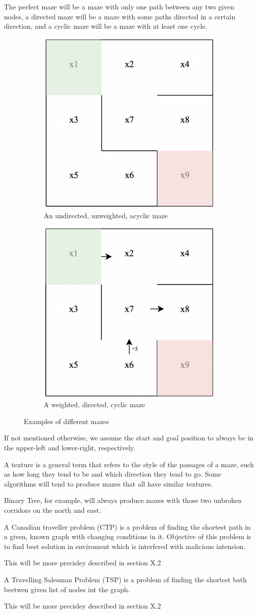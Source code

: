  The perfect maze will be a maze with only one path between any two given nodes, a directed maze will be a maze with some paths directed in a certain direction, and a cyclic maze will be a maze with at least one cycle. 
 \begin{figure}
	\centering
	\begin{subfigure}{.5\textwidth}
	  \centering
	  \includegraphics[width=.4\linewidth]{undirected_maze}
	  \caption{An undirected, unweighted, acyclic maze}
	  \label{fig:sub1}
	\end{subfigure}%
	\begin{subfigure}{.5\textwidth}
	  \centering
	  \includegraphics[width=.4\linewidth]{cyclic_maze}
	  \caption{A weighted, directed, cyclic maze}
	  \label{fig:sub2}
	\end{subfigure}
	\caption{Examples of different mazes}
	\label{fig:test}
	\end{figure}
	If not mentioned otherwise, we assume the start and goal position to always be in the upper-left and lower-right, respectively.
 \begin{definition}
A texture is a general term that refers to the style of the passages of a maze, such as how long they tend to be and which direction they tend to go. Some algorithms will tend to produce mazes that all have similar textures.\cite{mazes}
 \end{definition}
 Binary Tree, for example, will always produce mazes with those two unbroken corridors on the north and east.
\begin{definition}
A Canadian traveller problem (CTP) is a problem of finding the shortest path in a given, known graph with changing conditions in it. Objective of this problem is to find best solution in enviroment which is interfered with malicious intension.
\end{definition}
This will be more precisley described in section X.2
\begin{definition}
A Travelling Salesman Problem (TSP) is a problem of finding the shortest bath beetwen given list of nodes int the graph. 
\end{definition}
This will be more precisley described in section X.2
